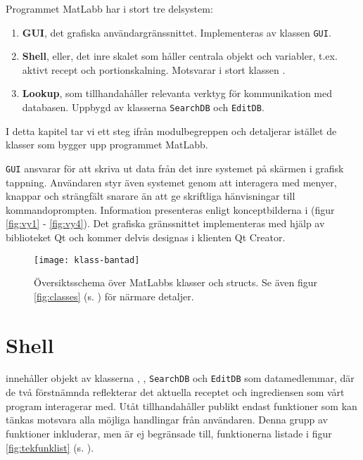 Programmet MatLabb har i stort tre delsystem:

\begin{enumerate}
\item \textbf{GUI}, det grafiska användargränssnittet. Implementeras av klassen \texttt{GUI}.
\item \textbf{Shell}, eller, det inre skalet som håller centrala objekt och variabler, t.ex. aktivt recept och portionskalning. Motsvarar i stort klassen \Shell.
\item \textbf{Lookup}, som tillhandahåller relevanta verktyg för kommunikation med databasen. Uppbygd av klasserna \verb=SearchDB= och \verb=EditDB=.
\end{enumerate}

I detta kapitel tar vi ett steg ifrån modulbegreppen och detaljerar istället de klasser som bygger upp programmet MatLabb.

\texttt{GUI} ansvarar för att skriva ut data från det inre systemet på skärmen i grafisk tappning. Användaren styr även systemet genom att interagera med menyer, knappar och strängfält snarare än att ge skriftliga hänvisningar till kommandoprompten. Information presenteras enligt konceptbilderna i (figur \ref{fig:vy1} - \ref{fig:vy4}). Det grafiska gränssnittet implementeras med hjälp av biblioteket Qt och kommer delvis designas i klienten Qt Creator.

\begin{figure}[h]
  \centering
  \texttt{[image: klass-bantad]}
  \caption{Översiktsschema över MatLabbs klasser och structs. Se även figur \ref{fig:classes} (s. \pageref{fig:classes}) för närmare detaljer.}
  \label{fig:redklass}
\end{figure}

\section{Shell}
\Shell{} innehåller objekt av klasserna \Recipe{}, \InfoIngredient{}, \verb=SearchDB= och \verb=EditDB= som datamedlemmar, där de två förstnämnda reflekterar det aktuella receptet och ingrediensen som vårt program interagerar med. Utåt tillhandahåller \Shell{} publikt endast funktioner som kan tänkas motsvara alla möjliga handlingar från användaren. Denna grupp av funktioner inkluderar, men är ej begränsade till, funktionerna listade i figur \ref{fig:tekfunklist} (s. \pageref{fig:tekfunklist}).

